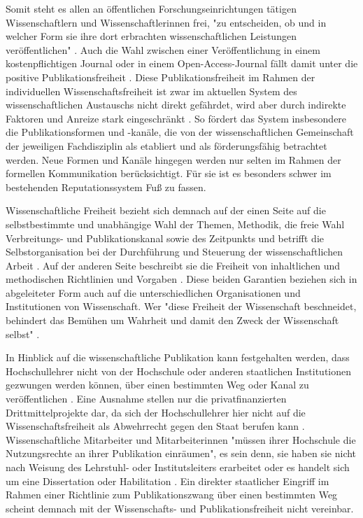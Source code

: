 Somit steht es allen an öffentlichen Forschungseinrichtungen tätigen Wissenschaftlern und Wissenschaftlerinnen frei, "zu entscheiden, ob und in welcher Form sie ihre dort erbrachten wissenschaftlichen Leistungen veröffentlichen" \cite{Schmidt_2009}. Auch die Wahl zwischen einer Veröffentlichung in einem kostenpflichtigen Journal oder in einem Open-Access-Journal fällt damit unter die positive Publikationsfreiheit \cite[:190]{Fehling_2014}. Diese Publikationsfreiheit
im Rahmen der individuellen Wissenschaftsfreiheit ist zwar im aktuellen System des wissenschaftlichen Austauschs nicht direkt gefährdet, wird aber durch indirekte Faktoren und Anreize stark eingeschränkt \cite{Binswanger_2014}. So fördert das System insbesondere die Publikationsformen und -kanäle, die von der wissenschaftlichen Gemeinschaft der jeweiligen Fachdisziplin als etabliert und als förderungsfähig betrachtet werden. Neue Formen und Kanäle hingegen werden nur selten im Rahmen der formellen Kommunikation berücksichtigt. Für sie ist es besonders schwer im bestehenden Reputationssystem Fuß zu fassen.

Wissenschaftliche Freiheit bezieht sich demnach auf der einen Seite auf die selbstbestimmte und unabhängige Wahl der Themen, Methodik, die freie Wahl Verbreitungs- und Publikationskanal sowie des Zeitpunkts und betrifft die Selbstorganisation bei der Durchführung und Steuerung der wissenschaftlichen Arbeit \cite[:190]{Fehling_2014}. Auf der anderen Seite beschreibt sie die Freiheit von inhaltlichen und methodischen Richtlinien und Vorgaben \cite[:140]{Goetting_2015}. Diese beiden Garantien beziehen sich in abgeleiteter Form auch auf die unterschiedlichen Organisationen und Institutionen von Wissenschaft. Wer "diese Freiheit der Wissenschaft beschneidet, behindert das Bemühen um Wahrheit und damit den Zweck der Wissenschaft selbst" \cite[:69]{Oezmen_2015}.

In Hinblick auf die wissenschaftliche Publikation kann festgehalten werden, dass Hochschullehrer nicht von der Hochschule oder anderen staatlichen Institutionen gezwungen werden können, über einen bestimmten Weg oder Kanal zu veröffentlichen \cite{Spindler_2006} \cite{Dorschel_2006}. Eine Ausnahme stellen nur die privatfinanzierten Drittmittelprojekte dar, da sich der Hochschullehrer hier nicht auf die Wissenschaftsfreiheit als Abwehrrecht gegen den Staat berufen kann \cite{Spindler_2006}. Wissenschaftliche Mitarbeiter und Mitarbeiterinnen "müssen ihrer Hochschule die Nutzungsrechte an ihrer Publikation einräumen", es sein denn, sie haben sie nicht nach Weisung des Lehrstuhl- oder Institutsleiters erarbeitet oder es handelt sich um eine Dissertation oder Habilitation \cite{Spindler_2006}. Ein direkter staatlicher Eingriff im Rahmen einer Richtlinie zum Publikationszwang über einen bestimmten Weg scheint demnach mit der Wissenschafts- und Publikationsfreiheit nicht vereinbar.

